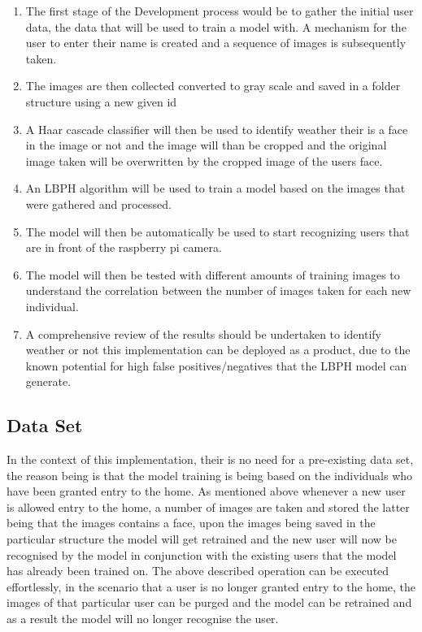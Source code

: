 \documentclass[journal]{IEEEtran}
\begin{document}
\begin{enumerate}
  \item The first stage of the Development process would be to gather the initial user data, the data that will be used to train a model with. A mechanism for the user to enter their name is created and a sequence of images is subsequently taken.
  \item The images are then collected converted to gray scale and saved in a folder structure using a new given id 
  \item A Haar cascade classifier will then be used to identify weather their is a face in the image or not and the image will than be cropped and the original image taken will be overwritten by the cropped image of the users face.
  \item An LBPH algorithm will be used to train a model based on the images that were gathered and processed.
  \item The model will then be automatically be used to start recognizing users that are in front of the raspberry pi camera.
  \item The model will then be tested with different amounts of training images to understand the correlation between the number of images taken for each new individual.
  \item A comprehensive review of the results should be undertaken to identify weather or not this implementation can be deployed as a product, due to the known potential for high false positives/negatives that the LBPH model can generate.
\end{enumerate}

\subsection{Data Set}
In the context of this implementation, their is no need for a pre-existing data set, the reason being is that the model training is being based on the individuals who have been granted entry to the home. As mentioned above whenever a new user is allowed entry to the home, a number of images are taken and stored the latter being that the images contains a face, upon the images being saved in the particular structure the model will get retrained and the new user will now be recognised by the model in conjunction with the existing users that the model has already been trained on. The above described operation can be executed effortlessly, in the scenario that a user is no longer granted entry to the home, the images of that particular user can be purged and the model can be retrained and as a result the model will no longer recognise the user.
\end{document}
